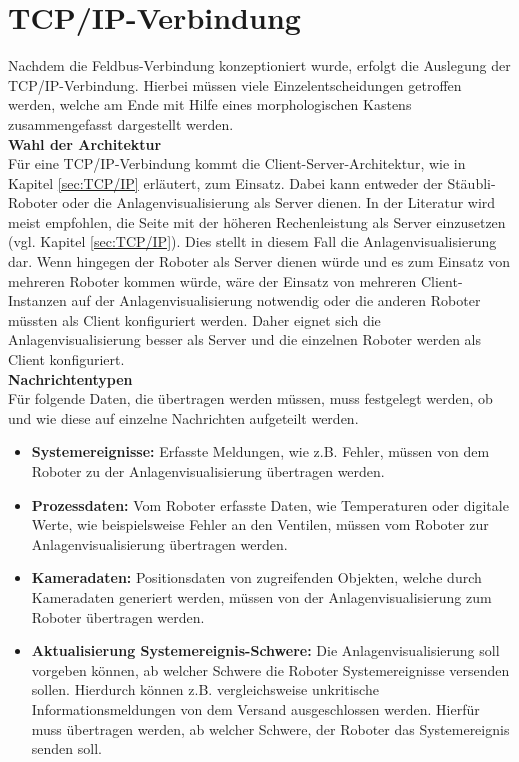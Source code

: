 \documentclass[ a4paper,
                oneside,
                toc=bibliography,
                toc=listof
                ]{scrbook}
\begin{document}
	\section{TCP/IP-Verbindung}
	\label{sec:KonzeptTCPIP}
	Nachdem die Feldbus-Verbindung konzeptioniert wurde, erfolgt die Auslegung der TCP/IP-Verbindung. Hierbei müssen viele Einzelentscheidungen getroffen werden, welche am Ende mit Hilfe eines morphologischen Kastens zusammengefasst dargestellt werden.\vspace{0.5\baselineskip}\\
	\textbf{Wahl der Architektur} \\
	Für eine TCP/IP-Verbindung kommt die Client-Server-Architektur, wie in Kapitel \ref{sec:TCP/IP} erläutert, zum Einsatz. Dabei kann entweder der Stäubli-Roboter oder die Anlagenvisualisierung als Server dienen. In der Literatur wird meist empfohlen, die Seite mit der höheren Rechenleistung als Server einzusetzen (vgl. Kapitel \ref{sec:TCP/IP}). Dies stellt in diesem Fall die Anlagenvisualisierung dar. Wenn hingegen der Roboter als Server dienen würde und es zum Einsatz von mehreren Roboter kommen würde, wäre der Einsatz von mehreren Client-Instanzen auf der Anlagenvisualisierung notwendig oder die anderen Roboter müssten als Client konfiguriert werden. Daher eignet sich die Anlagenvisualisierung besser als Server und die einzelnen Roboter werden als Client konfiguriert. \vspace{0.5\baselineskip}\\
	\textbf{Nachrichtentypen}\\
	Für folgende Daten, die übertragen werden müssen, muss festgelegt werden, ob und wie diese auf einzelne Nachrichten aufgeteilt werden.
	\begin{itemize}
		\item \textbf{Systemereignisse: } Erfasste Meldungen, wie z.B. Fehler, müssen von dem Roboter zu der Anlagenvisualisierung übertragen werden.
		\item \textbf{Prozessdaten: } Vom Roboter erfasste Daten, wie Temperaturen oder digitale Werte, wie beispielsweise Fehler an den Ventilen, müssen vom Roboter zur Anlagenvisualisierung übertragen werden.
		\item \textbf{Kameradaten:} Positionsdaten von zugreifenden Objekten, welche durch Kameradaten generiert werden, müssen von der Anlagenvisualisierung zum Roboter übertragen werden.
		\item \textbf{Aktualisierung Systemereignis-Schwere:} Die Anlagenvisualisierung soll vorgeben können, ab welcher Schwere die Roboter Systemereignisse versenden sollen. Hierdurch können z.B. vergleichsweise unkritische Informationsmeldungen von dem Versand ausgeschlossen werden. Hierfür muss übertragen werden, ab welcher Schwere, der Roboter das Systemereignis senden soll.\\
	\end{itemize}
\end{document}
